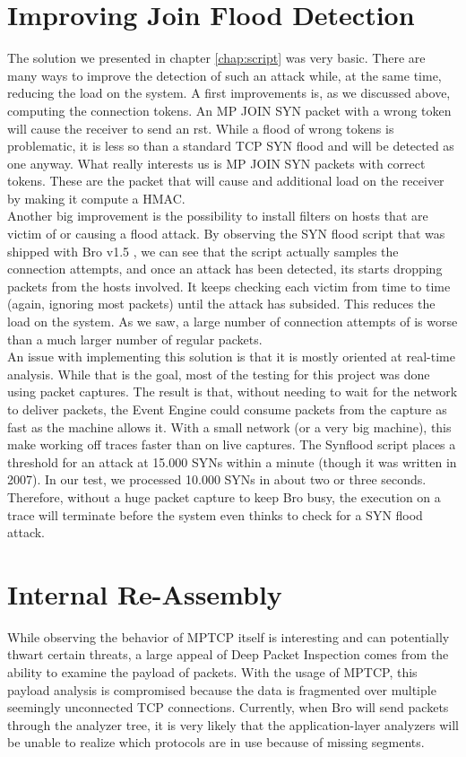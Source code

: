 \section{Improving Join Flood Detection}
The solution we presented in chapter \ref{chap:script} was very basic. There are many ways to improve the detection of such an attack while, at the same time, reducing the load on the system. A first improvements is, as we discussed above, computing the connection tokens. An MP JOIN SYN packet with a wrong token will cause the receiver to send an rst. While a flood of wrong tokens is problematic, it is less so than a standard TCP SYN flood and will be detected as one anyway. What really interests us is MP JOIN SYN packets with correct tokens. These are the packet that will cause and additional load on the receiver by making it compute a HMAC. \\

Another big improvement is the possibility to install filters on hosts that are victim of or causing a flood attack. By observing the SYN flood script that was shipped with Bro v1.5 \cite{synflood}, we can see that the script actually samples the connection attempts, and once an attack has been detected, its starts dropping packets from the hosts involved. It keeps checking each victim from time to time (again, ignoring most packets) until the attack has subsided. This reduces the load on the system. As we saw, a large number of connection attempts of is worse than a much larger number of regular packets. \\

An issue with implementing this solution is that it is mostly oriented at real-time analysis. While that is the goal, most of the testing for this project was done using packet captures. The result is that, without needing to wait for the network to deliver packets, the Event Engine could consume packets from the capture as fast as the machine allows it. With a small network (or a very big machine), this make working off traces faster than on live captures. The Synflood script places a threshold for an attack at 15.000 SYNs within a minute (though it was written in 2007). In our test, we processed 10.000 SYNs in about two or three seconds. Therefore, without a huge packet capture to keep Bro busy, the execution on a trace will terminate before the system even thinks to check for a SYN flood attack.

\section{Internal Re-Assembly}
While observing the behavior of MPTCP itself is interesting and can potentially thwart certain threats, a large appeal of Deep Packet Inspection comes from the ability to examine the payload of packets. With the usage of MPTCP, this payload analysis is compromised because the data is fragmented over multiple seemingly unconnected TCP connections. Currently, when Bro will send packets through the analyzer tree, it is very likely that the application-layer analyzers will be unable to realize which protocols are in use because of missing segments. \\

